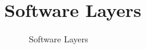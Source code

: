 \section{Software Layers}

\begin{figure}[ht!]
	\centering{
		\resizebox{0.9\textwidth}{!} {
			
		}
	}

	\caption{Software Layers}
\end{figure}